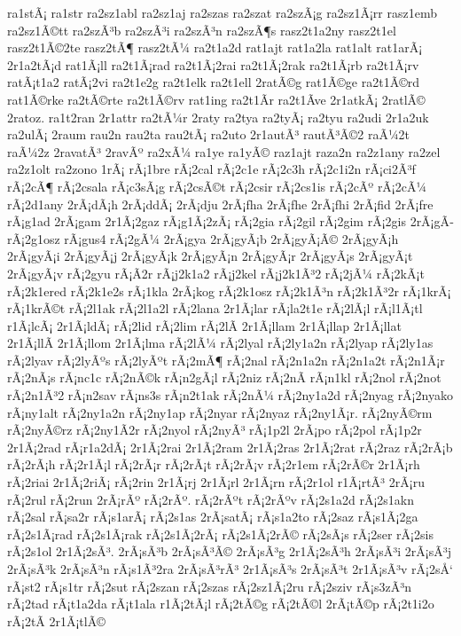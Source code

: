 {ra1stÃ¡
ra1str
ra2sz1abl
ra2sz1aj
ra2szas
ra2szat
ra2szÃ¡g
ra2sz1Ã¡rr
rasz1emb
ra2sz1Ã©tt
ra2szÃ³b
ra2szÃ³i
ra2szÃ³n
ra2szÃ¶s
rasz2t1a2ny
rasz2t1el
rasz2t1Ã©2te
rasz2tÃ¶
rasz2tÃ¼
ra2t1a2d
rat1ajt
rat1a2la
rat1alt
rat1arÃ¡
2r1a2tÃ¡d
rat1Ã¡ll
ra2t1Ã¡rad
ra2t1Ã¡2rai
ra2t1Ã¡2rak
ra2t1Ã¡rb
ra2t1Ã¡rv
ratÃ¡t1a2
ratÃ¡2vi
ra2t1e2g
ra2t1elk
ra2t1ell
2ratÃ©g
rat1Ã©ge
ra2t1Ã©rd
rat1Ã©rke
ra2tÃ©rte
ra2t1Ã©rv
rat1ing
ra2t1Ã­r
ra2t1Ã­ve
2r1atkÃ¡
2ratlÃ©
2ratoz.
ra1t2ran
2r1attr
ra2tÃ¼r
2raty
ra2tya
ra2tyÃ¡
ra2tyu
ra2udi
2r1a2uk
ra2ulÃ¡
2raum
rau2n
rau2ta
rau2tÃ¡
ra2uto
2r1autÃ³
rautÃ³Ã©2
raÃ¼2t
raÃ¼2z
2ravatÃ³
2ravÃº
ra2xÃ¼
ra1ye
ra1yÃ©
raz1ajt
raza2n
ra2z1any
ra2zel
ra2z1olt
ra2zono
1rÃ¡
rÃ¡1bre
rÃ¡2cal
rÃ¡2c1e
rÃ¡2c3h
rÃ¡2c1i2n
rÃ¡ci2Ã³f
rÃ¡2cÃ¶
rÃ¡2csala
rÃ¡c3sÃ¡g
rÃ¡2csÃ©t
rÃ¡2csir
rÃ¡2cs1is
rÃ¡2cÃº
rÃ¡2cÃ¼
rÃ¡2d1any
2rÃ¡dÃ¡h
2rÃ¡ddÃ¡
2rÃ¡dju
2rÃ¡fha
2rÃ¡fhe
2rÃ¡fhi
2rÃ¡fid
2rÃ¡fre
rÃ¡g1ad
2rÃ¡gam
2r1Ã¡2gaz
rÃ¡g1Ã¡2zÃ¡
rÃ¡2gia
rÃ¡2gil
rÃ¡2gim
rÃ¡2gis
2rÃ¡gÃ­
rÃ¡2g1osz
rÃ¡gus4
rÃ¡2gÃ¼
2rÃ¡gya
2rÃ¡gyÃ¡b
2rÃ¡gyÃ¡Ã©
2rÃ¡gyÃ¡h
2rÃ¡gyÃ¡i
2rÃ¡gyÃ¡j
2rÃ¡gyÃ¡k
2rÃ¡gyÃ¡n
2rÃ¡gyÃ¡r
2rÃ¡gyÃ¡s
2rÃ¡gyÃ¡t
2rÃ¡gyÃ¡v
rÃ¡2gyu
rÃ¡Ã­2r
rÃ¡j2k1a2
rÃ¡j2kel
rÃ¡j2k1Ã³2
rÃ¡2jÃ¼
rÃ¡2kÃ¡t
rÃ¡2k1ered
rÃ¡2k1e2s
rÃ¡1kla
2rÃ¡kog
rÃ¡2k1osz
rÃ¡2k1Ã³n
rÃ¡2k1Ã³2r
rÃ¡1krÃ¡
rÃ¡1krÃ©t
rÃ¡2l1ak
rÃ¡2l1a2l
rÃ¡2lana
2r1Ã¡lar
rÃ¡la2t1e
rÃ¡2lÃ¡l
rÃ¡l1Ã¡tl
r1Ã¡lcÃ¡
2r1Ã¡ldÃ¡
rÃ¡2lid
rÃ¡2lim
rÃ¡2lÃ­
2r1Ã¡llam
2r1Ã¡llap
2r1Ã¡llat
2r1Ã¡llÃ­
2r1Ã¡llom
2r1Ã¡lma
rÃ¡2lÃ¼
rÃ¡2lyal
rÃ¡2ly1a2n
rÃ¡2lyap
rÃ¡2ly1as
rÃ¡2lyav
rÃ¡2lyÃºs
rÃ¡2lyÃºt
rÃ¡2mÃ¶
rÃ¡2nal
rÃ¡2n1a2n
rÃ¡2n1a2t
rÃ¡2n1Ã¡r
rÃ¡2nÃ¡s
rÃ¡nc1c
rÃ¡2nÃ©k
rÃ¡n2gÃ¡l
rÃ¡2niz
rÃ¡2nÃ­
rÃ¡n1kl
rÃ¡2nol
rÃ¡2not
rÃ¡2n1Ã³2
rÃ¡n2sav
rÃ¡ns3s
rÃ¡n2t1ak
rÃ¡2nÃ¼
rÃ¡2ny1a2d
rÃ¡2nyag
rÃ¡2nyako
rÃ¡ny1alt
rÃ¡2ny1a2n
rÃ¡2ny1ap
rÃ¡2nyar
rÃ¡2nyaz
rÃ¡2ny1Ã¡r.
rÃ¡2nyÃ©rm
rÃ¡2nyÃ©rz
rÃ¡2ny1Ã­2r
rÃ¡2nyol
rÃ¡2nyÃ³
rÃ¡1p2l
2rÃ¡po
rÃ¡2pol
rÃ¡1p2r
2r1Ã¡2rad
rÃ¡r1a2dÃ¡
2r1Ã¡2rai
2r1Ã¡2ram
2r1Ã¡2ras
2r1Ã¡2rat
rÃ¡2raz
rÃ¡2rÃ¡b
rÃ¡2rÃ¡h
rÃ¡2r1Ã¡l
rÃ¡2rÃ¡r
rÃ¡2rÃ¡t
rÃ¡2rÃ¡v
rÃ¡2r1em
rÃ¡2rÃ©r
2r1Ã¡rh
rÃ¡2riai
2r1Ã¡2riÃ¡
rÃ¡2rin
2r1Ã¡rj
2r1Ã¡rl
2r1Ã¡rn
rÃ¡2r1ol
r1Ã¡rtÃ³
2rÃ¡ru
rÃ¡2rul
rÃ¡2run
2rÃ¡rÃº
rÃ¡2rÃº.
rÃ¡2rÃºt
rÃ¡2rÃºv
rÃ¡2s1a2d
rÃ¡2s1akn
rÃ¡2sal
rÃ¡sa2r
rÃ¡s1arÃ¡
rÃ¡2s1as
2rÃ¡satÃ¡
rÃ¡s1a2to
rÃ¡2saz
rÃ¡s1Ã¡2ga
rÃ¡2s1Ã¡rad
rÃ¡2s1Ã¡rak
rÃ¡2s1Ã¡2rÃ¡
rÃ¡2s1Ã¡2rÃ©
rÃ¡2sÃ¡s
rÃ¡2ser
rÃ¡2sis
rÃ¡2s1ol
2r1Ã¡2sÃ³.
2rÃ¡sÃ³b
2rÃ¡sÃ³Ã©
2rÃ¡sÃ³g
2r1Ã¡2sÃ³h
2rÃ¡sÃ³i
2rÃ¡sÃ³j
2rÃ¡sÃ³k
2rÃ¡sÃ³n
rÃ¡s1Ã³2ra
2rÃ¡sÃ³rÃ³
2r1Ã¡sÃ³s
2rÃ¡sÃ³t
2r1Ã¡sÃ³v
rÃ¡2sÅ‘
rÃ¡st2
rÃ¡s1tr
rÃ¡2sut
rÃ¡2szan
rÃ¡2szas
rÃ¡2sz1Ã¡2ru
rÃ¡2sziv
rÃ¡s3zÃ³n
rÃ¡2tad
rÃ¡t1a2da
rÃ¡t1ala
r1Ã¡2tÃ¡l
rÃ¡2tÃ©g
rÃ¡2tÃ©l
2rÃ¡tÃ©p
rÃ¡2t1i2o
rÃ¡2tÃ­
2r1Ã¡tlÃ©
}
